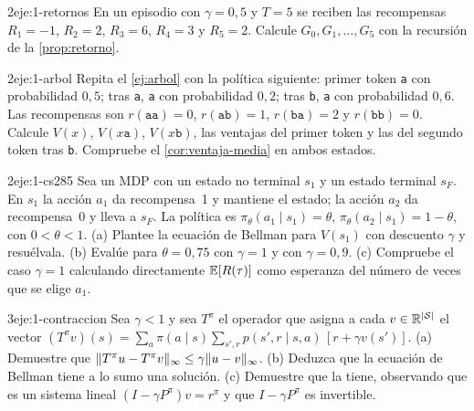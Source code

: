 \begin{ejercicio}{2}{eje:1-retornos}
En un episodio con $\gamma=0{,}5$ y $T=5$ se reciben las recompensas $R_1=-1$, $R_2=2$, $R_3=6$, $R_4=3$ y $R_5=2$. Calcule $G_0,G_1,\dots,G_5$ con la recursión de la \cref{prop:retorno}.
\end{ejercicio}

\begin{ejercicio}{2}{eje:1-arbol}
Repita el \cref{ej:arbol} con la política siguiente: primer token \texttt{a} con probabilidad $0{,}5$; tras \texttt{a}, \texttt{a} con probabilidad $0{,}2$; tras \texttt{b}, \texttt{a} con probabilidad $0{,}6$. Las recompensas son $r(\texttt{aa})=0$, $r(\texttt{ab})=1$, $r(\texttt{ba})=2$ y $r(\texttt{bb})=0$. Calcule $V(x)$, $V(x\texttt{a})$, $V(x\texttt{b})$, las ventajas del primer token y las del segundo token tras \texttt{b}. Compruebe el \cref{cor:ventaja-media} en ambos estados.
\end{ejercicio}

\begin{ejercicio}{2}{eje:1-cs285}
Sea un MDP con un estado no terminal $s_1$ y un estado terminal $s_F$. En $s_1$ la acción $a_1$ da recompensa~1 y mantiene el estado; la acción $a_2$ da recompensa~0 y lleva a $s_F$. La política es $\pi_\theta(a_1\mid s_1)=\theta$, $\pi_\theta(a_2\mid s_1)=1-\theta$, con $0<\theta<1$. (a) Plantee la ecuación de Bellman para $V(s_1)$ con descuento $\gamma$ y resuélvala. (b) Evalúe para $\theta=0{,}75$ con $\gamma=1$ y con $\gamma=0{,}9$. (c) Compruebe el caso $\gamma=1$ calculando directamente $\mathbb{E}[R(\tau)]$ como esperanza del número de veces que se elige $a_1$.
\end{ejercicio}

\begin{ejercicio}{3}{eje:1-contraccion}
Sea $\gamma<1$ y sea $T^{\pi}$ el operador que asigna a cada $v\in\mathbb{R}^{\lvert\mathcal{S}\rvert}$ el vector
$(T^{\pi}v)(s)=\sum_a\pi(a\mid s)\sum_{s',r}p(s',r\mid s,a)\,[r+\gamma v(s')]$. (a) Demuestre que $\lVert T^{\pi}u-T^{\pi}v\rVert_\infty\le\gamma\lVert u-v\rVert_\infty$. (b) Deduzca que la ecuación de Bellman tiene a lo sumo una solución. (c) Demuestre que la tiene, observando que es un sistema lineal $(I-\gamma P^{\pi})v=r^{\pi}$ y que $I-\gamma P^{\pi}$ es invertible.
\end{ejercicio}
